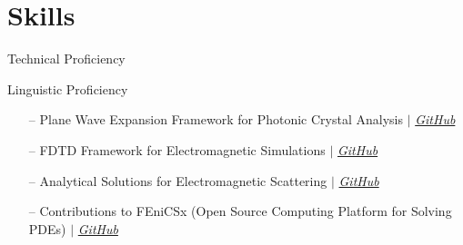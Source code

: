 \documentclass{cv}
\begin{document}
\section{Skills}
Technical Proficiency \vspace{-6pt}
\begin{itemize}
\end{itemize}
Linguistic Proficiency \vspace{-6pt}
\begin{itemize}
\end{itemize}

\begin{itemize}[leftmargin=10pt, itemsep=0pt]
    \item[--] Plane Wave Expansion Framework for Photonic Crystal Analysis
        $|$ \emph{\href{https://github.com/tiagovla/morpho.py}{\color{blue}GitHub}}
    \item[--] FDTD Framework for Electromagnetic Simulations
        $|$ \emph{\href{https://github.com/tiagovla/fdtd.py}{\color{blue}GitHub}}
    \item[--] Analytical Solutions for Electromagnetic Scattering
        $|$ \emph{\href{https://github.com/tiagovla/scatsol}{\color{blue}GitHub}}
    \item[--] Contributions to FEniCSx (Open Source Computing Platform for Solving PDEs)
        $|$ \emph{\href{https://github.com/FEniCS}{\color{blue}GitHub}}
\end{itemize}
\end{document}
